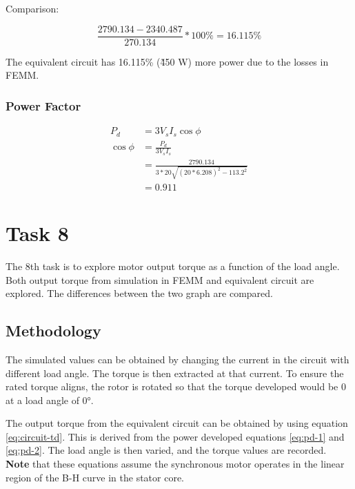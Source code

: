 \documentclass[12pt]{article}
\begin{document}
Comparison:

\begin{center}
    \begin{equation*}
        \frac{2790.134 - 2340.487}{270.134} * 100\% = 16.115\%
    \end{equation*}
\end{center}

The equivalent circuit has 16.115\% (\~450 W) more power due to the losses in FEMM. 

\subsubsection{Power Factor}

\begin{center}
    \begin{align*}
        P_{d} &= 3 V_{s} I_{s} \cos{\phi}\\
        \cos{\phi} &= \frac{P_{d}}{3 V_{s} I_{s}}\\
            &= \frac{2790.134}{3 * 20 \sqrt{(20 * 6.208)^{2} - 113.2^{2}}}\\
            &= 0.911
    \end{align*}
\end{center}

\section{Task 8}

The 8th task is to explore motor output torque as a function of the load angle. Both output torque from simulation in FEMM and equivalent circuit are explored. The differences between the two graph are compared.

\subsection{Methodology}

The simulated values can be obtained by changing the current in the circuit with different load angle. The torque is then extracted at that current. To ensure the rated torque aligns, the rotor is rotated so that the torque developed would be 0 at a load angle of \ang{0}.

The output torque from the equivalent circuit can be obtained by using equation \ref{eq:circuit-td}. This is derived from the power developed equations \ref{eq:pd-1} and \ref{eq:pd-2}. The load angle is then varied, and the torque values are recorded. \textbf{Note} that these equations assume the synchronous motor operates in the linear region of the B-H curve in the stator core.
\end{document}
